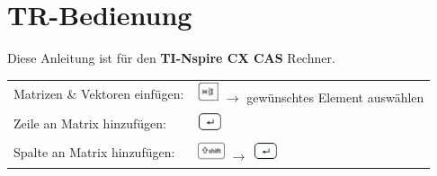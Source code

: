 \clearpage
\section{TR-Bedienung}
Diese Anleitung ist für den \textbf{TI-Nspire CX CAS} Rechner.\\[0.4cm]
\begin{tabular}{ll}
	Matrizen \& Vektoren einfügen: & \includegraphics[height=0.6cm]{pics/TR_Symbol.png} $\rightarrow$ gewünschtes Element auswählen\\[0.2cm]
	Zeile an Matrix hinzufügen: & \includegraphics[height=0.6cm]{pics/TR_Enter_Pfeil.png}\\[0.2cm]
	Spalte an Matrix hinzufügen: & \includegraphics[height=0.6cm]{pics/TR_Shift.png} $\rightarrow$ \includegraphics[height=0.6cm]{pics/TR_Enter_Pfeil.png}\\[0.8cm]
	

\end{tabular}
